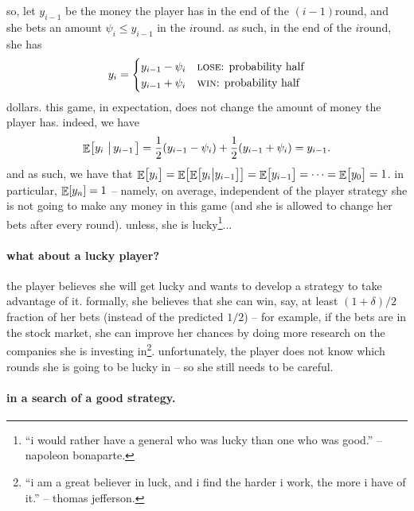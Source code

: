 so, let $y_{i-1}$ be the money the player has in the end of the
$(i-1)$\th round, and she bets an amount $\psi_i \leq y_{i-1}$ in the
$i$\th round.  as such, in the end of the $i$\th round, she has
\begin{align*}
    y_{i} = \begin{cases}
        y_{i-1} - \psi_{i} & \text{\textsc{lose}: probability half}\\
        y_{i-1} + \psi_i & \text{\textsc{win}: probability half}
    \end{cases}
\end{align*}
dollars.  this game, in expectation, does not change the amount of
money the player has. indeed, we have
\begin{align*}
    \Ex{y_i\sep{y_{i-1}}}%
    =%
    \frac{1}{2}\pth{ y_{i-1} - \psi_i} + \frac{1}{2}\pth{y_{i-1} +
       \psi_i}%
    =%
    y_{i-1}.
\end{align*}
and as such, we have that
$\mathop{\mathbb{E}}\!\left[ {\bigl. y_i} \right] = \mathop{\mathbb{E}}\!\left[ {\mathop{\mathbb{E}}\!\left[ {y_{i}\bigl| {y_{i-1}} } \right] \bigl.\! } \right] = \mathop{\mathbb{E}}\!\left[ {
   \bigl. y_{i-1}} \right] = \cdots = \mathop{\mathbb{E}}\!\left[ {y_0 \bigl.} \right] = 1\big.$. in
particular, $\mathop{\mathbb{E}}\!\left[ {y_n} \right] = 1$ -- namely, on average, independent of the
player strategy she is not going to make any money in this game (and
she is allowed to change her bets after every round). unless, she is
lucky\footnote{``i would rather have a general who was lucky than one
   who was good.'' -- napoleon bonaparte.}...




\paragraph*{what about a lucky player?}

the player believes she will get lucky and wants to develop a strategy
to take advantage of it.  formally, she believes that she can win,
say, at least $(1+\delta)/2$ fraction of her bets (instead of the
predicted $1/2$) -- for example, if the bets are in the stock market,
she can improve her chances by doing more research on the companies
she is investing in\footnote{``i am a great believer in luck, and i
   find the harder i work, the more i have of it.'' -- thomas
   jefferson.}. unfortunately, the player does not know which rounds
she is going to be lucky in -- so she still needs to be careful.


\paragraph*{in a search of a good strategy.}

